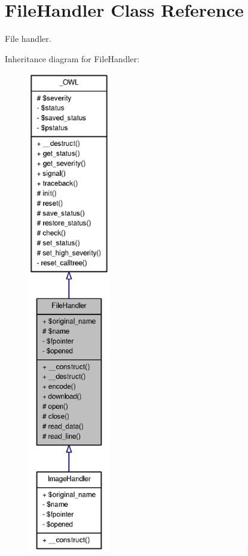 \section{FileHandler Class Reference}
\label{classFileHandler}


File handler.  




Inheritance diagram for FileHandler:\nopagebreak
\begin{figure}[H]
\begin{center}
\leavevmode
\includegraphics[height=600pt]{classFileHandler__inherit__graph}
\end{center}
\end{figure}


